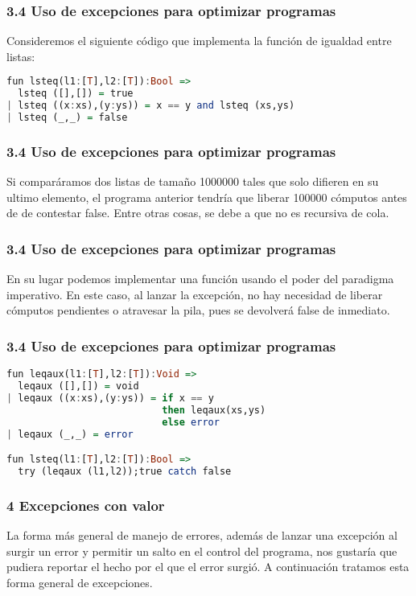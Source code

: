 \documentclass[xcolor=dvipsnames,table,spanish]{beamer}
\begin{document}
\begin{frame}[fragile]
\frametitle{3.4 Uso de excepciones para optimizar programas}
Consideremos el siguiente código que implementa la función de igualdad entre listas:

\begin{lstlisting}[language=Haskell]
fun lsteq(l1:[T],l2:[T]):Bool =>
  lsteq ([],[]) = true
| lsteq ((x:xs),(y:ys)) = x == y and lsteq (xs,ys)
| lsteq (_,_) = false
\end{lstlisting}

\end{frame}

\begin{frame}[fragile]
\frametitle{3.4 Uso de excepciones para optimizar programas}

Si comparáramos dos listas de tamaño 1000000 tales que solo difieren en su ultimo elemento, el programa anterior tendría que liberar 100000 cómputos antes de de contestar false. Entre otras cosas, se debe a que no es recursiva de cola.
\end{frame}

\begin{frame}[fragile]
\frametitle{3.4 Uso de excepciones para optimizar programas}
En su lugar podemos implementar una función usando el poder del paradigma imperativo.
\newline
En este caso, al lanzar la excepción, no hay necesidad de liberar cómputos pendientes o atravesar la pila, pues se devolverá false de inmediato.
\end{frame}

\begin{frame}[fragile]
\frametitle{3.4 Uso de excepciones para optimizar programas}


\begin{lstlisting}[language=Haskell]
fun leqaux(l1:[T],l2:[T]):Void =>
  leqaux ([],[]) = void
| leqaux ((x:xs),(y:ys)) = if x == y
                           then leqaux(xs,ys)
                           else error
| leqaux (_,_) = error

fun lsteq(l1:[T],l2:[T]):Bool =>
  try (leqaux (l1,l2));true catch false
\end{lstlisting}
\end{frame}
\begin{frame}
\frametitle{4 Excepciones con valor}
La forma más general de manejo de errores, además de lanzar una excepción al surgir un error y permitir un salto en el control del programa, nos gustaría que  pudiera reportar el hecho por el que el error surgió. A continuación tratamos esta forma general de excepciones.
\end{frame}
\end{document}
